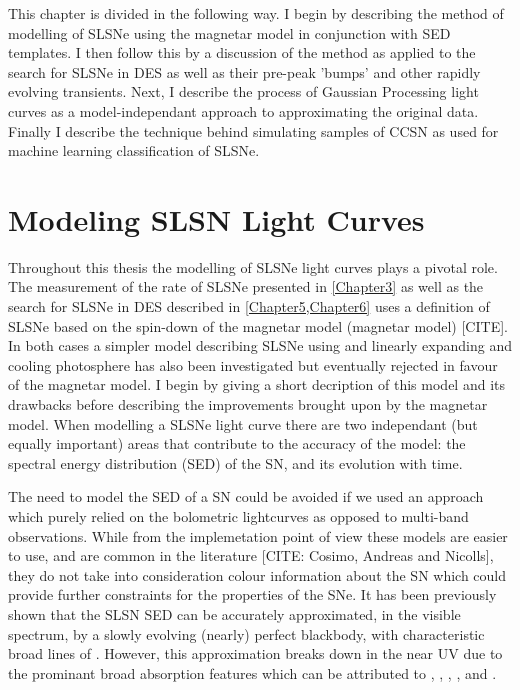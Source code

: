 This chapter is divided in the following way. I begin by describing the method of modelling of SLSNe using the magnetar model in conjunction with SED templates. I then follow this by a discussion of the method as applied to the search for SLSNe in DES as well as their pre-peak 'bumps' and other rapidly evolving transients. Next, I describe the process of Gaussian Processing light curves as a model-independant approach to approximating the original data. Finally I describe the technique behind simulating samples of CCSN as used for machine learning classification of SLSNe.

\section{Modeling SLSN Light Curves} \label{sec:SLAP}
Throughout this thesis the modelling of SLSNe light curves plays a pivotal role. The measurement of the rate of SLSNe presented in \cref{Chapter3} as well as the search for SLSNe in DES described in \cref{Chapter5,Chapter6} uses a definition of SLSNe based on the spin-down of the magnetar model (magnetar model) [CITE]. In both cases a simpler model describing SLSNe using and linearly expanding and cooling photosphere has also been investigated but eventually rejected in favour of the magnetar model. I begin by giving a short decription of this model and its drawbacks before describing the improvements brought upon by the magnetar model. When modelling a SLSNe light curve there are two independant (but equally important) areas that contribute to the accuracy of the model: the spectral energy distribution (SED) of the SN, and its evolution with time.

The need to model the SED of a SN could be avoided if we used an approach which purely relied on the bolometric lightcurves as opposed to multi-band observations. While from the implemetation point of view these models are easier to use, and are common in the literature [CITE: Cosimo, Andreas and Nicolls], they do not take into consideration colour information about the SN which could provide further constraints for the properties of the SNe. It has been previously shown \citep{2011ApJ...743..114C,2013ApJ...779...98H,2015MNRAS.449.1215P,2014ApJ...797...24V} that the SLSN SED can be accurately approximated, in the visible spectrum, by a slowly evolving (nearly) perfect blackbody, with characteristic broad lines of . However, this approximation breaks down in the near UV due to the prominant broad absorption features which can be attributed to , , , ,  and  \citep[see][for line identifications]{2016MNRAS.458.3455M}.

